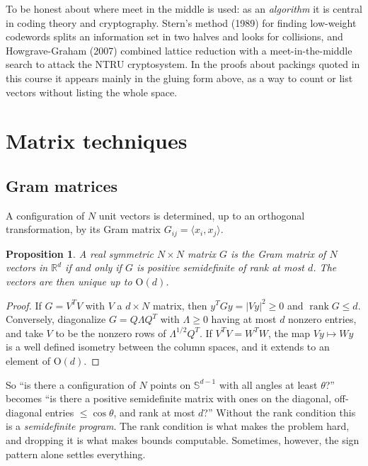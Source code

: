 \documentclass[11pt,openany]{book}
\theoremstyle{plain}
\newtheorem{proposition}[theorem]{Proposition}
\theoremstyle{definition}
\theoremstyle{remark}
\newcommand{\R}{\mathbb{R}}
\newcommand{\Sph}{\mathbb{S}}          %
\newcommand{\Orth}{\mathrm{O}}
\newcommand{\abs}[1]{\left\lvert #1 \right\rvert}
\newcommand{\ip}[2]{\langle #1, #2\rangle}
\begin{document}
To be honest about where meet in the middle is used: as an \emph{algorithm} it is central in coding
theory and cryptography. Stern's method (1989) for finding low-weight codewords splits an information set
in two halves and looks for collisions, and Howgrave-Graham (2007) combined lattice reduction with a
meet-in-the-middle search to attack the NTRU cryptosystem. In the proofs about packings quoted in this
course it appears mainly in the gluing form above, as a way to count or list vectors without listing the
whole space.

\section{Matrix techniques}
\label{COMP:sec:matrix}

\subsection{Gram matrices}
A configuration of $N$ unit vectors is determined, up to an orthogonal transformation, by its Gram
matrix $G_{ij}=\ip{x_i}{x_j}$.

\begin{proposition}\label{COMP:prop:gram}
A real symmetric $N\times N$ matrix $G$ is the Gram matrix of $N$ vectors in $\R^d$ if and only if $G$ is
positive semidefinite of rank at most $d$. The vectors are then unique up to $\Orth(d)$.
\end{proposition}

\begin{proof}
If $G=V^TV$ with $V$ a $d\times N$ matrix, then $y^TGy=\abs{Vy}^2\ge0$ and $\operatorname{rank}G\le d$.
Conversely, diagonalize $G=Q\Lambda Q^T$ with $\Lambda\ge0$ having at most $d$ nonzero entries, and take
$V$ to be the nonzero rows of $\Lambda^{1/2}Q^T$. If $V^TV=W^TW$, the map $Vy\mapsto Wy$ is a well defined
isometry between the column spaces, and it extends to an element of $\Orth(d)$.
\end{proof}

So ``is there a configuration of $N$ points on $\Sph^{d-1}$ with all angles at least $\theta$?'' becomes ``is
there a positive semidefinite matrix with ones on the diagonal, off-diagonal entries $\le\cos\theta$, and
rank at most $d$?'' Without the rank condition this is a \emph{semidefinite program}. The rank condition
is what makes the problem hard, and dropping it is what makes bounds computable. Sometimes, however, the
sign pattern alone settles everything.
\end{document}
